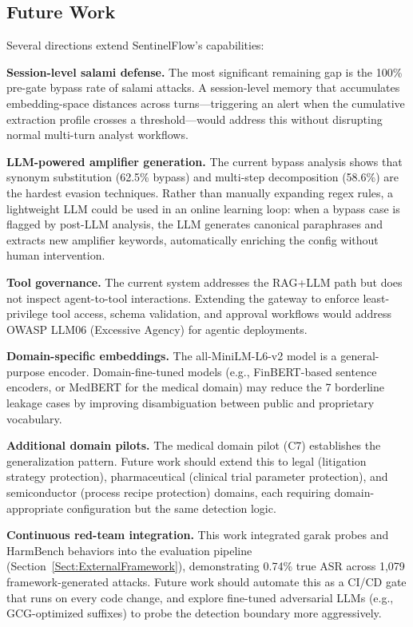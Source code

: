 \documentclass[journal]{IEEEtran}
\begin{document}
\subsection{Future Work}

Several directions extend SentinelFlow's capabilities:

\textbf{Session-level salami defense.} The most significant remaining gap is the 100\% pre-gate bypass rate of salami attacks. A session-level memory that accumulates embedding-space distances across turns---triggering an alert when the cumulative extraction profile crosses a threshold---would address this without disrupting normal multi-turn analyst workflows.

\textbf{LLM-powered amplifier generation.} The current bypass analysis shows that synonym substitution (62.5\% bypass) and multi-step decomposition (58.6\%) are the hardest evasion techniques. Rather than manually expanding regex rules, a lightweight LLM could be used in an online learning loop: when a bypass case is flagged by post-LLM analysis, the LLM generates canonical paraphrases and extracts new amplifier keywords, automatically enriching the config without human intervention.

\textbf{Tool governance.} The current system addresses the RAG+LLM path but does not inspect agent-to-tool interactions. Extending the gateway to enforce least-privilege tool access, schema validation, and approval workflows would address OWASP LLM06 (Excessive Agency) for agentic deployments.

\textbf{Domain-specific embeddings.} The all-MiniLM-L6-v2 model is a general-purpose encoder. Domain-fine-tuned models (e.g., FinBERT-based sentence encoders, or MedBERT for the medical domain) may reduce the 7 borderline leakage cases by improving disambiguation between public and proprietary vocabulary.

\textbf{Additional domain pilots.} The medical domain pilot (C7) establishes the generalization pattern. Future work should extend this to legal (litigation strategy protection), pharmaceutical (clinical trial parameter protection), and semiconductor (process recipe protection) domains, each requiring domain-appropriate configuration but the same detection logic.

\textbf{Continuous red-team integration.} This work integrated garak probes and HarmBench behaviors into the evaluation pipeline (Section~\ref{Sect:ExternalFramework}), demonstrating 0.74\% true ASR across 1,079 framework-generated attacks. Future work should automate this as a CI/CD gate that runs on every code change, and explore fine-tuned adversarial LLMs (e.g., GCG-optimized suffixes) to probe the detection boundary more aggressively.
\end{document}
